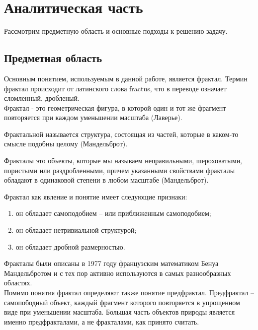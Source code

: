 \section{Аналитическая часть}

Рассмотрим предметную область и основные подходы к решению задачу. 

\subsection{Предметная область}

Основным понятием, используемым в данной работе, является фрактал. Термин фрактал происходит от латинского слова fractus, что в переводе означает сломленный, дробленый. 
\\

   Фрактал - это геометрическая фигура, в которой один и тот же фрагмент повторяется при каждом уменьшении масштаба (Лаверье). 



   Фрактальной называется структура, состоящая из частей, которые в каком-то смысле подобны целому (Мандельброт). 



   Фракталы это объекты, которые мы называем неправильными, шероховатыми, пористыми или раздробленными, причем указанными свойствами фракталы обладают в одинаковой степени в любом масштабе (Мандельброт). 


Фрактал как явление и понятие имеет следующие признаки:
\\
\begin{enumerate}
\item он обладает самоподобием – или приближенным самоподобием;
\item он обладает нетривиальной структурой;
\item он обладает дробной размерностью.
\end{enumerate}

Фракталы были описаны в 1977 году французским математиком Бенуа Мандельбротом и с тех пор активно используются в самых разнообразных областях.
\\

Помимо понятия фрактал определяют также понятие предфрактал. Предфрактал – самопободный объект, каждый фрагмент которого повторяется в упрощенном виде при уменьшении масштаба. Большая часть объектов природы является именно предфракталами, а не фракталами, как принято считать.
\\

